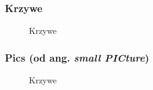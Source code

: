 \documentclass[10pt,t]{beamer}
\begin{document}
\begin{frame}
  \frametitle{Krzywe}


  \begin{figure}

    \centering

    \begin{tikzpicture}












    \end{tikzpicture}


    \caption{Krzywe}

  \end{figure}

\end{frame}





\begin{frame}
  \frametitle{Pics (od ang. \textit{small PICture})}


  \begin{figure}

    \centering

    \begin{tikzpicture}[scale=2]










    \end{tikzpicture}


    \caption{Krzywe}

  \end{figure}

\end{frame}
\end{document}
